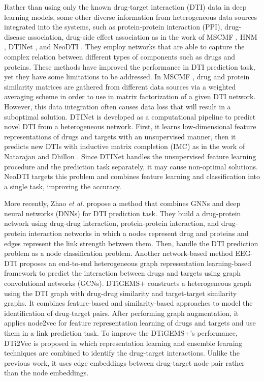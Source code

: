 Rather than using only the known drug-target interaction (DTI) data in deep learning models, some other diverse information from heterogeneous data sources integrated into the systems, such as protein-protein interaction (PPI), drug-disease association, drug-side effect association as in the work of MSCMF \cite{zheng2013collaborative}, HNM \cite{wang2014drug}, DTINet \cite{luo2017network}, and NeoDTI \cite{wan2018neodti}. They employ networks that are able to capture the complex relation between different types of components such as drugs and proteins. These methods have improved the performance in DTI prediction task, yet they have some limitations to be addressed. In MSCMF \cite{zheng2013collaborative}, drug and protein similarity matrices are gathered from different data sources via a weighted averaging scheme in order to use in matrix factorization of a given DTI network. However, this data integration often causes data loss that will result in a suboptimal solution. DTINet \cite{luo2017network} is developed as a computational pipeline to predict novel DTI from a heterogeneous network. First, it learns low-dimensional feature representations of drugs and targets with an unsupervised manner, then it predicts new DTIs with inductive matrix completion (IMC) as in the work of Natarajan and Dhillon \cite{natarajan2014inductive}. Since DTINet handles the unsupervised feature learning procedure and the prediction task separately, it may cause non-optimal solutions. NeoDTI \cite{wan2018neodti} targets this problem and combines feature learning and classification into a single task, improving the accuracy. 

More recently, Zhao \textit{et al.} \cite{zhao2021identifying} propose a method that combines GNNs and deep neural networks (DNNs) for DTI prediction task. They build a drug-protein network using drug-drug interaction, protein-protein interaction, and drug-protein interaction networks in which a nodes represent drug and proteins and edges represent the link strength between them. Then, handle the DTI prediction problem as a node classification problem. Another network-based method EEG-DTI \cite{peng2021end} proposes an end-to-end heterogeneous graph representation learning-based framework to predict the interaction between drugs and targets using graph convolutional networks (GCNs). DTiGEMS$+$ \cite{thafar2020dtigems+} constructs a heterogeneous graph using the DTI graph with drug-drug similarity and target-target similarity graphs. It combines feature-based and similarity-based approaches to model the identification of drug-target pairs. After performing graph augmentation, it applies node2vec \cite{grover2016node2vec} for feature representation learning of drugs and targets and use them in a link prediction task. To improve the DTiGEMS$+$'s performance, DTi2Vec \cite{thafar2021dti2vec} is proposed in which representation learning and ensemble learning techniques are combined to identify the drug-target interactions. Unlike the previous work, it uses edge embeddings between drug-target node pair rather than the node embeddings.

